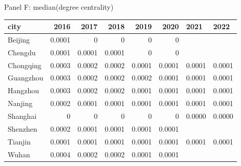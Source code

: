 \caption{Panel F: median(degree centrality)}
\begin{tabular}{lrrrrrll}
\hline
 city      &   2016 &   2017 &   2018 &   2019 &   2020 & 2021   & 2022   \\
\hline
 Beijing   & 0.0001 & 0      & 0      & 0      & 0      &        &        \\
 Chengdu   & 0.0001 & 0.0001 & 0.0001 & 0      & 0      &        &        \\
 Chongqing & 0.0003 & 0.0002 & 0.0002 & 0.0001 & 0.0001 & 0.0001 & 0.0001 \\
 Guangzhou & 0.0003 & 0.0002 & 0.0002 & 0.0002 & 0.0001 & 0.0001 & 0.0001 \\
 Hangzhou  & 0.0003 & 0.0002 & 0.0002 & 0.0001 & 0.0001 & 0.0001 & 0.0001 \\
 Nanjing   & 0.0002 & 0.0001 & 0.0001 & 0.0001 & 0.0001 & 0.0001 & 0.0001 \\
 Shanghai  & 0      & 0      & 0      & 0      & 0      & 0.0000 & 0.0000 \\
 Shenzhen  & 0.0002 & 0.0001 & 0.0001 & 0.0001 & 0.0001 &        &        \\
 Tianjin   & 0.0001 & 0.0001 & 0.0001 & 0.0001 & 0.0001 & 0.0001 & 0.0001 \\
 Wuhan     & 0.0004 & 0.0002 & 0.0002 & 0.0001 & 0.0001 &        &        \\
\hline
\end{tabular}